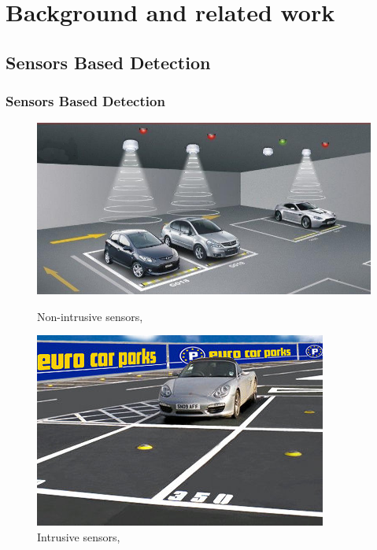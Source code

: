 \documentclass{beamer}
\begin{document}
\section{Background and related work}

\subsection{Sensors Based Detection}

\begin{frame}
\frametitle{Sensors Based Detection}

\begin{figure}[!htbp]
  \centering
  \begin{minipage}[b]{0.5\textwidth}
    \includegraphics[width=\textwidth]{Pictures/overhead}
    \caption{Non-intrusive sensors, \cite{overhead}}
    \label{nonintru}
  \end{minipage}
  \hfill
  \begin{minipage}[b]{0.4\textwidth}
    \includegraphics[width=\textwidth]{Pictures/sensor}
    \caption{Intrusive sensors, \cite{ground}}
    \label{intru}
  \end{minipage}
\end{figure}

\end{frame}
\end{document}
